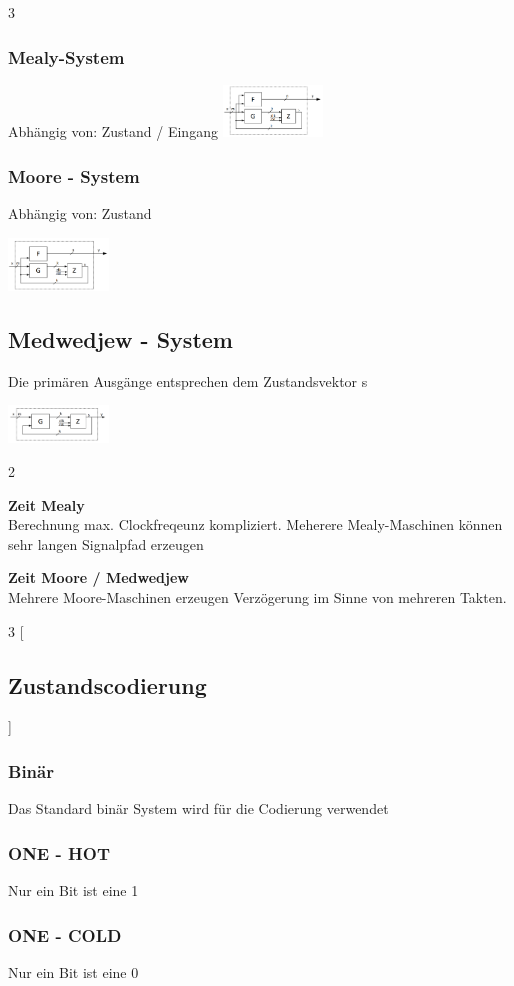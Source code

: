 \documentclass[10pt]{article}
\begin{document}
\begin{multicols}{3}
\subsubsection{Mealy-System}
Abhängig von: Zustand / Eingang
\includegraphics[width=0.2\textwidth]{Mealy.PNG}
\columnbreak
\subsubsection{Moore - System}
Abhängig von: Zustand
\begin{center}
    \includegraphics[width=0.2\textwidth]{Moore.PNG}
\end{center}
\subsection{Medwedjew - System}
Die primären Ausgänge entsprechen
dem Zustandsvektor s
\begin{center}
    \includegraphics[width=0.2\textwidth]{Medjedew.PNG}
\end{center}
\end{multicols}
\begin{multicols}{2}
    \begin{center}
        \textbf{Zeit Mealy} \\
    Berechnung max. Clockfreqeunz kompliziert. Meherere Mealy-Maschinen können sehr langen Signalpfad erzeugen
    \end{center}
    \columnbreak
    \begin{center}
            \textbf{Zeit Moore / Medwedjew} \\
    Mehrere Moore-Maschinen erzeugen Verzögerung im Sinne von mehreren Takten.
    \end{center}
\end{multicols}
\begin{multicols}{3}
    [\subsection{Zustandscodierung}]
    \subsubsection{Binär}
    Das Standard binär System wird für die Codierung verwendet
    \columnbreak
    \subsubsection{ONE - HOT}
    Nur ein Bit ist eine 1
    \subsubsection{ONE - COLD}
    Nur ein Bit ist eine 0
\end{multicols}
\end{document}
